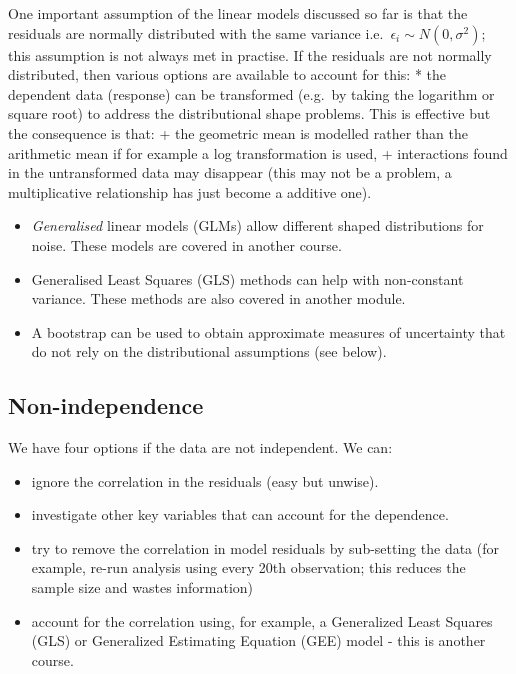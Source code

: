 \documentclass[
  oneside]{krantz}
\providecommand{\tightlist}{%
  \setlength{\itemsep}{0pt}\setlength{\parskip}{0pt}}
\begin{document}
One important assumption of the linear models discussed so far is that the residuals are normally distributed with the same variance i.e.~\(\epsilon_i \sim N(0, \sigma^2)\); this assumption is not always met in practise. If the residuals are not normally distributed, then various options are available to account for this:
* the dependent data (response) can be transformed (e.g.~by taking the logarithm or square root) to address the distributional shape problems. This is effective but the consequence is that:
+ the geometric mean is modelled rather than the arithmetic mean if for example a log transformation is used,
+ interactions found in the untransformed data may disappear (this may not be a problem, a multiplicative relationship has just become a additive one).

\begin{itemize}
\item
  \emph{Generalised} linear models (GLMs) allow different shaped distributions for noise. These models are covered in another course.
\item
  Generalised Least Squares (GLS) methods can help with non-constant variance. These methods are also covered in another module.
\item
  A bootstrap can be used to obtain approximate measures of uncertainty that do not rely on the distributional assumptions (see below).
\end{itemize}

\hypertarget{non-independence}{%
\subsection{Non-independence}\label{non-independence}}

We have four options if the data are not independent. We can:

\begin{itemize}
\tightlist
\item
  ignore the correlation in the residuals (easy but unwise).
\item
  investigate other key variables that can account for the dependence.
\item
  try to remove the correlation in model residuals by sub-setting the data (for example, re-run analysis using every 20th observation; this reduces the sample size and wastes information)
\item
  account for the correlation using, for example, a Generalized Least Squares (GLS) or Generalized Estimating Equation (GEE) model - this is another course.
\end{itemize}
\end{document}
